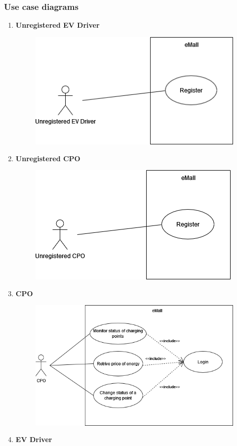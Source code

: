 \subsubsection{Use case diagrams}
\begin{enumerate}
    \item \textbf{Unregistered EV Driver}
          \begin{figure}[H]
              \centering
              \includegraphics[scale=0.8]{src/use_case_diagram/driver_registration.png}
          \end{figure}
    \item \textbf{Unregistered CPO}
          \begin{figure}[H]
              \centering
              \includegraphics[scale=0.8]{src/use_case_diagram/cpo_registration.png}
          \end{figure}
    \item \textbf{CPO}
          \begin{figure}[H]
              \centering
              \includegraphics[scale=0.8]{src/use_case_diagram/cpo.png}
          \end{figure}
    \item \textbf{EV Driver}
\end{enumerate}

